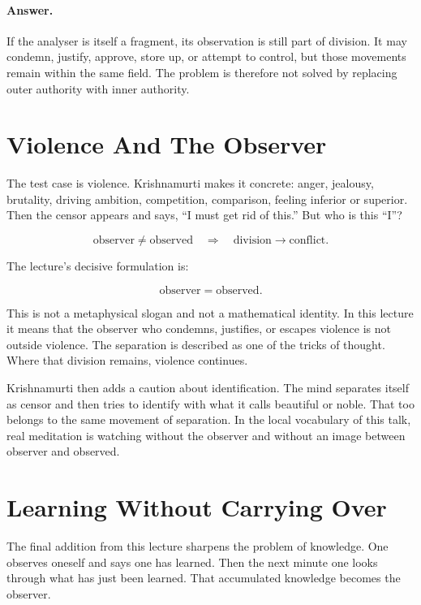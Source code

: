 \documentclass[11pt,oneside]{book}
\begin{document}
\paragraph{Answer.}
If the analyser is itself a fragment, its observation is still part of division. It may condemn, justify, approve, store up, or attempt to control, but those movements remain within the same field. The problem is therefore not solved by replacing outer authority with inner authority.

\section{Violence And The Observer}

The test case is violence. Krishnamurti makes it concrete: anger, jealousy, brutality, driving ambition, competition, comparison, feeling inferior or superior. Then the censor appears and says, ``I must get rid of this.'' But who is this ``I''?

\begin{equation}
\text{observer} \ne \text{observed}
\quad\Longrightarrow\quad
\text{division}
\longrightarrow
\text{conflict}.
\end{equation}

The lecture's decisive formulation is:

\begin{equation}
\text{observer} = \text{observed}.
\end{equation}

This is not a metaphysical slogan and not a mathematical identity. In this lecture it means that the observer who condemns, justifies, or escapes violence is not outside violence. The separation is described as one of the tricks of thought. Where that division remains, violence continues.

Krishnamurti then adds a caution about identification. The mind separates itself as censor and then tries to identify with what it calls beautiful or noble. That too belongs to the same movement of separation. In the local vocabulary of this talk, real meditation is watching without the observer and without an image between observer and observed.

\section{Learning Without Carrying Over}

The final addition from this lecture sharpens the problem of knowledge. One observes oneself and says one has learned. Then the next minute one looks through what has just been learned. That accumulated knowledge becomes the observer.
\end{document}
